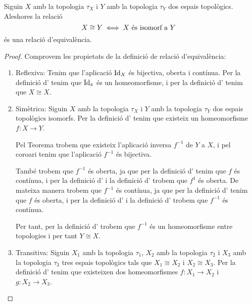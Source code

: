 \documentclass[../Apunts.tex]{subfiles}
\begin{document}
	\begin{proposition}
			Siguin \(X\) amb la topologia \(\tau_{X}\) i \(Y\) amb la topologia \(\tau_{Y}\) dos espais topològics. Aleshores la relació
			\[X\cong Y\iff X\text{ és isomorf a }Y\]
			és una relació d'equivalència.
			\begin{proof}
				Comprovem les propietats de la definició de relació d'equivalència:
				\begin{enumerate}
					\item Reflexiva: Tenim que l'aplicació \(\operatorname{Id}_{X}\) és bijectiva, oberta i contínua. Per la definició d' tenim que \(\operatorname{Id}_{x}\) és un homeomorfisme, i per la definició d' tenim que \(X\cong X\).
					\item Simètrica: Siguin \(X\) amb la topologia \(\tau_{X}\) i \(Y\) amb la topologia \(\tau_{Y}\) dos espais topològics isomorfs. Per la definició d' tenim que existeix un homeomorfisme \(f\colon X\longrightarrow Y\).
					
					Pel Teorema  trobem que existeix l'aplicació inversa \(f^{-1}\) de \(Y\) a \(X\), i pel coro{\lgem}ari  tenim que l'aplicació \(f^{-1}\) és bijectiva.
					
					També trobem que \(f^{-1}\) és oberta, ja que per la definició d' tenim que \(f\) és contínua, i per la definició d' i la definició d' trobem que \(f^{1}\) és oberta. De mateixa manera trobem que \(f^{-1}\) és contínua, ja que per la definició d' tenim que \(f\) és oberta, i per la definició d' i la definició d' trobem que \(f^{-1}\) és contínua.
					
					Per tant, per la definició d' trobem que \(f^{-1}\) és un homeomorfisme entre topologies i per tant \(Y\cong X\).
					\item Transitiva: Siguin \(X_{1}\) amb la topologia \(\tau_{1}\), \(X_{2}\) amb la topologia \(\tau_{2}\) i \(X_{3}\) amb la topologia \(\tau_{3}\) tres espais topològics tals que \(X_{1}\cong X_{2}\) i \(X_{2}\cong X_{3}\). Per la definició d' tenim que existeixen dos homeomorfismes \(f\colon X_{1}\longrightarrow X_{2}\) i \(g\colon X_{2}\longrightarrow X_{3}\).
					

\end{enumerate}
\end{proof}
\end{proposition}
\end{document}

